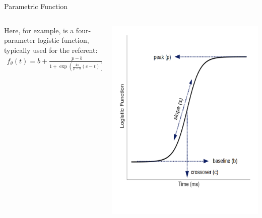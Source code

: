 \documentclass{beamer}
\begin{document}
\begin{frame}{Parametric Function}

\vspace{-5mm}

\begin{columns}
\begin{column}{0.45\textwidth}
Here, for example, is a four-parameter logistic function, typically used for the referent: \vspace{5mm}
\begin{align*}
f_{\theta}(t) = b + \frac{p-b}{1 + \exp \left( \frac{4s}{p-b} (c - t) \right)}
\end{align*}
\end{column}
\begin{column}{0.5\textwidth}  %
\begin{center}
\includegraphics[scale=0.3]{img/logistic_label.png}
\end{center}
\end{column}
\end{columns}
\end{frame}
\end{document}
